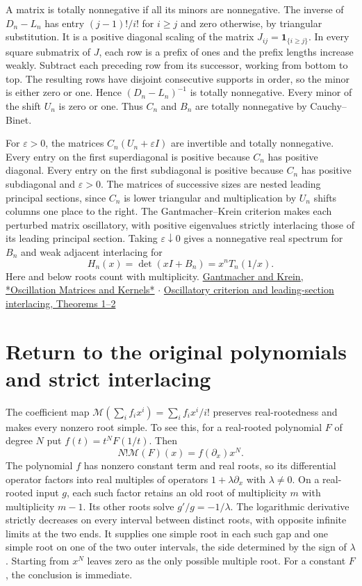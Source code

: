 \documentclass[11pt]{article}
\begin{document}
A matrix is totally nonnegative if all its minors are nonnegative. The inverse of $D_n-L_n$ has entry $(j-1)!/i!$ for $i\ge j$ and zero otherwise, by triangular substitution. It is a positive diagonal scaling of the matrix $J_{ij}=\mathbf 1_{\{i\ge j\}}$. In every square submatrix of $J$, each row is a prefix of ones and the prefix lengths increase weakly. Subtract each preceding row from its successor, working from bottom to top. The resulting rows have disjoint consecutive supports in order, so the minor is either zero or one. Hence $(D_n-L_n)^{-1}$ is totally nonnegative. Every minor of the shift $U_n$ is zero or one. Thus $C_n$ and $B_n$ are totally nonnegative by Cauchy–Binet.

For $\varepsilon>0$, the matrices $C_n(U_n+\varepsilon I)$ are invertible and totally nonnegative. Every entry on the first superdiagonal is positive because $C_n$ has positive diagonal. Every entry on the first subdiagonal is positive because $C_n$ has positive subdiagonal and $\varepsilon>0$. The matrices of successive sizes are nested leading principal sections, since $C_n$ is lower triangular and multiplication by $U_n$ shifts columns one place to the right. The Gantmacher–Krein criterion makes each perturbed matrix oscillatory, with positive eigenvalues strictly interlacing those of its leading principal section. Taking $\varepsilon\downarrow0$ gives a nonnegative real spectrum for $B_n$ and weak adjacent interlacing for
\[
H_n(x)=\det(xI+B_n)=x^n T_n(1/x).
\tag{5}
\]
Here and below roots count with multiplicity. \href{https://doi.org/10.1090/chel/345}{Gantmacher and Krein, *Oscillation Matrices and Kernels*} $\cdot$ \href{https://files.ele-math.com/articles/oam-01-18.pdf}{Oscillatory criterion and leading-section interlacing, Theorems 1–2}

\section{Return to the original polynomials and strict interlacing}

The coefficient map $\mathcal M(\sum_i f_i x^i)=\sum_i f_i x^i/i!$ preserves real-rootedness and makes every nonzero root simple. To see this, for a real-rooted polynomial $F$ of degree $N$ put $f(t)=t^NF(1/t)$. Then
\[
N!\mathcal M(F)(x)=f(\partial_x)x^N.
\]
The polynomial $f$ has nonzero constant term and real roots, so its differential operator factors into real multiples of operators $1+\lambda\partial_x$ with $\lambda\ne0$. On a real-rooted input $g$, each such factor retains an old root of multiplicity $m$ with multiplicity $m-1$. Its other roots solve $g'/g=-1/\lambda$. The logarithmic derivative strictly decreases on every interval between distinct roots, with opposite infinite limits at the two ends. It supplies one simple root in each such gap and one simple root on one of the two outer intervals, the side determined by the sign of $\lambda$. Starting from $x^N$ leaves zero as the only possible multiple root. For a constant $F$, the conclusion is immediate.
\end{document}
